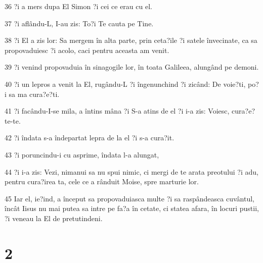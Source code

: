 \par 36 ?i a mers dupa El Simon ?i cei ce erau cu el.
\par 37 ?i aflându-L, I-au zis: To?i Te cauta pe Tine.
\par 38 ?i El a zis lor: Sa mergem în alta parte, prin ceta?ile ?i satele învecinate, ca sa propovaduiesc ?i acolo, caci pentru aceasta am venit.
\par 39 ?i venind propovaduia în sinagogile lor, în toata Galileea, alungând pe demoni.
\par 40 ?i un lepros a venit la El, rugându-L ?i îngenunchind ?i zicând: De voie?ti, po?i sa ma cura?e?ti.
\par 41 ?i facându-I-se mila, a întins mâna ?i S-a atins de el ?i i-a zis: Voiesc, cura?e?te-te.
\par 42 ?i îndata s-a îndepartat lepra de la el ?i s-a cura?it.
\par 43 ?i poruncindu-i cu asprime, îndata l-a alungat,
\par 44 ?i i-a zis: Vezi, nimanui sa nu spui nimic, ci mergi de te arata preotului ?i adu, pentru cura?irea ta, cele ce a rânduit Moise, spre marturie lor.
\par 45 Iar el, ie?ind, a început sa propovaduiasca multe ?i sa raspândeasca cuvântul, încât Iisus nu mai putea sa intre pe fa?a în cetate, ci statea afara, în locuri pustii, ?i veneau la El de pretutindeni.

\chapter{2}

